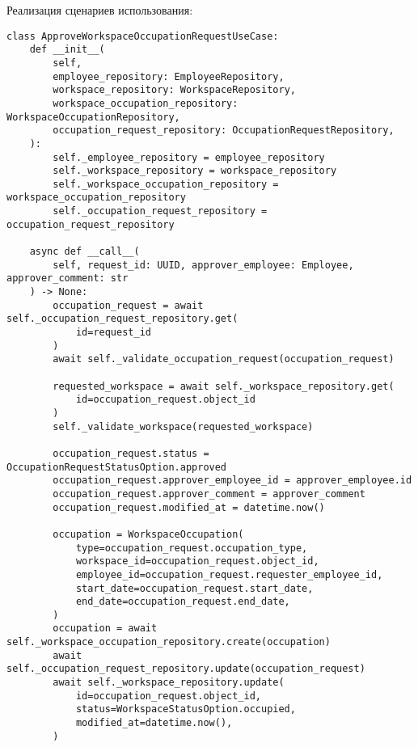 \noindent
Реализация сценариев использования:

\begin{lstlisting}[style=pythonstyle]
class ApproveWorkspaceOccupationRequestUseCase:
    def __init__(
        self,
        employee_repository: EmployeeRepository,
        workspace_repository: WorkspaceRepository,
        workspace_occupation_repository: WorkspaceOccupationRepository,
        occupation_request_repository: OccupationRequestRepository,
    ):
        self._employee_repository = employee_repository
        self._workspace_repository = workspace_repository
        self._workspace_occupation_repository = workspace_occupation_repository
        self._occupation_request_repository = occupation_request_repository

    async def __call__(
        self, request_id: UUID, approver_employee: Employee, approver_comment: str
    ) -> None:
        occupation_request = await self._occupation_request_repository.get(
            id=request_id
        )
        await self._validate_occupation_request(occupation_request)

        requested_workspace = await self._workspace_repository.get(
            id=occupation_request.object_id
        )
        self._validate_workspace(requested_workspace)

        occupation_request.status = OccupationRequestStatusOption.approved
        occupation_request.approver_employee_id = approver_employee.id
        occupation_request.approver_comment = approver_comment
        occupation_request.modified_at = datetime.now()

        occupation = WorkspaceOccupation(
            type=occupation_request.occupation_type,
            workspace_id=occupation_request.object_id,
            employee_id=occupation_request.requester_employee_id,
            start_date=occupation_request.start_date,
            end_date=occupation_request.end_date,
        )
        occupation = await self._workspace_occupation_repository.create(occupation)
        await self._occupation_request_repository.update(occupation_request)
        await self._workspace_repository.update(
            id=occupation_request.object_id,
            status=WorkspaceStatusOption.occupied,
            modified_at=datetime.now(),
        )


\end{lstlisting}
